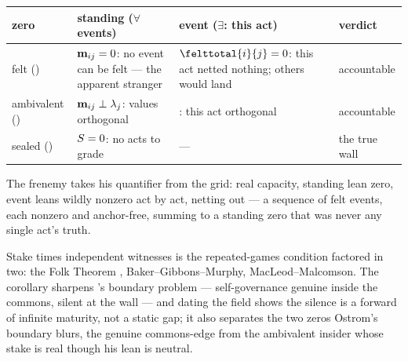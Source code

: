 \documentclass[../main]{subfiles}
\begin{document}
\begin{table}[htbp]
  \centering
  \begin{tabularx}{\textwidth}{@{} l L L l @{}}
    \toprule
    \textbf{zero} & \textbf{standing} ($\forall$ events) & \textbf{event} ($\exists$: this act) & \textbf{verdict} \\
    \midrule
    felt () & $\mathbf{m}\sb{ ij }=0$: no event can be felt ---
      the apparent stranger & $\felttotal{i}{j}=0$: this act netted nothing; others
      would land & accountable \\
    \addlinespace
    ambivalent () & $\mathbf{m}\sb{ ij }\perp\lambda\sb{j}$:
      values orthogonal & : this act orthogonal & accountable \\
    \addlinespace
    sealed () & $S=0$: no acts to grade & --- & the true wall \\
    \bottomrule
  \end{tabularx}
\end{table}

The frenemy takes his quantifier from the grid: real capacity, standing lean zero, event
leans wildly nonzero act by act, netting out --- a sequence of felt events, each nonzero
and anchor-free, summing to a standing zero that was never any single act's truth.

\begin{econ}[label=e:repeated, title={The repeated-games condition, factored in two},
  ref=f:acc, cites={a:folk,a:ostrom}, departs=wall,
  stopsat={self-governance genuine inside the commons, silent at the wall}]
  Stake times independent witnesses is the repeated-games condition factored in two: the
  Folk Theorem \parencite{a:folk}, Baker--Gibbons--Murphy, MacLeod--Malcomson. The corollary
  sharpens \textcite{a:ostrom}'s boundary
  problem --- self-governance genuine inside the commons, silent at the wall --- and dating
  the field shows the silence is a forward of infinite maturity, not a static gap; it also
  separates the two zeros Ostrom's boundary blurs, the genuine commons-edge from the
  ambivalent insider whose stake is real though his lean is neutral.
\end{econ}
\end{document}
